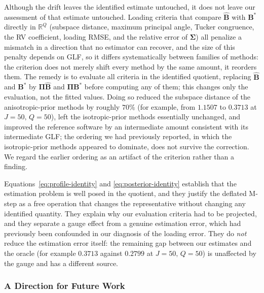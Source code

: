 Although the drift leaves the identified estimate untouched, it does not leave our assessment of that estimate untouched. Loading criteria that compare $\hat{\mathbf{B}}$ with $\mathbf{B}^\ast$ directly in $\mathbb{R}^Q$ (subspace distance, maximum principal angle, Tucker congruence, the RV coefficient, loading RMSE, and the relative error of $\bm{\Sigma}$) all penalize a mismatch in a direction that no estimator can recover, and the size of this penalty depends on GLF, so it differs systematically between families of methods: the criterion does not merely shift every method by the same amount, it reorders them. The remedy is to evaluate all criteria in the identified quotient, replacing $\hat{\mathbf{B}}$ and $\mathbf{B}^\ast$ by $\bm{\Pi}\hat{\mathbf{B}}$ and $\bm{\Pi}\mathbf{B}^\ast$ before computing any of them; this changes only the evaluation, not the fitted values. Doing so reduced the subspace distance of the anisotropic-prior methods by roughly $70\%$ (for example, from $1.1507$ to $0.3713$ at $J=50,\,Q=50$), left the isotropic-prior methods essentially unchanged, and improved the reference software by an intermediate amount consistent with its intermediate GLF; the ordering we had previously reported, in which the isotropic-prior methods appeared to dominate, does not survive the correction. We regard the earlier ordering as an artifact of the criterion rather than a finding.

Equations~\eqref{eq:profile-identity} and \eqref{eq:posterior-identity} establish that the estimation problem is well posed in the quotient, and they justify the deflated M-step as a free operation that changes the representative without changing any identified quantity. They explain why our evaluation criteria had to be projected, and they separate a gauge effect from a genuine estimation error, which had previously been confounded in our diagnosis of the loading error. They do \emph{not} reduce the estimation error itself: the remaining gap between our estimates and the oracle (for example $0.3713$ against $0.2799$ at $J=50,\,Q=50$) is unaffected by the gauge and has a different source.
\fi

\iffalse
\subsubsection{A Direction for Future Work}
\label{subsubsec:direction-future-work}


